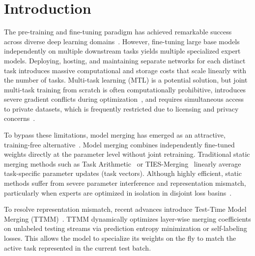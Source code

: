 \documentclass{article}
\theoremstyle{plain}
\theoremstyle{definition}
\theoremstyle{remark}
\begin{document}
\section{Introduction}
\label{sec:intro}
The pre-training and fine-tuning paradigm has achieved remarkable success across diverse deep learning domains~\cite{vaswani2017attention, devlin2018bert, he2016deep, dosovitskiy2020image}. However, fine-tuning large base models independently on multiple downstream tasks yields multiple specialized expert models. Deploying, hosting, and maintaining separate networks for each distinct task introduces massive computational and storage costs that scale linearly with the number of tasks. Multi-task learning (MTL) is a potential solution, but joint multi-task training from scratch is often computationally prohibitive, introduces severe gradient conflicts during optimization~\cite{yu2020gradient, sener2018multi}, and requires simultaneous access to private datasets, which is frequently restricted due to licensing and privacy concerns~\cite{zhang2022survey, caruana1997multitask}.

To bypass these limitations, model merging has emerged as an attractive, training-free alternative~\cite{wortsman2022robust, matena2021merging, ilharco2022editing}. Model merging combines independently fine-tuned weights directly at the parameter level without joint retraining. Traditional static merging methods such as Task Arithmetic~\cite{ilharco2022editing} or TIES-Merging~\cite{yadav2023resolving} linearly average task-specific parameter updates (task vectors). Although highly efficient, static methods suffer from severe parameter interference and representation mismatch, particularly when experts are optimized in isolation in disjoint loss basins~\cite{ainsworth2022git, stoica2023zip}.

To resolve representation mismatch, recent advances introduce Test-Time Model Merging (TTMM)~\cite{zhao2024dynamic, li2024test}. TTMM dynamically optimizes layer-wise merging coefficients on unlabeled testing streams via prediction entropy minimization or self-labeling losses. This allows the model to specialize its weights on the fly to match the active task represented in the current test batch.
\end{document}
